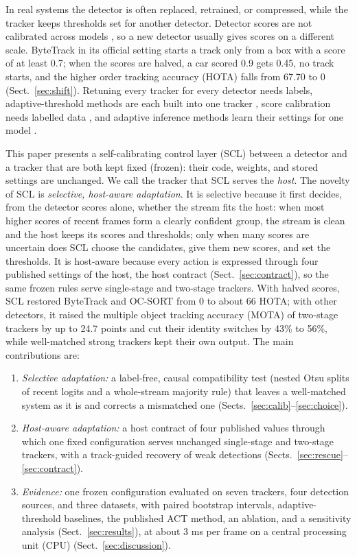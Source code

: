 \documentclass[pdflatex,sn-mathphys-num,iicol]{sn-jnl}
\newcommand{\scl}{SCL}
\begin{document}
In real systems the detector is often replaced, retrained, or compressed, while the tracker keeps
thresholds set for another detector. Detector scores are not calibrated across models
\cite{kuppers2020detcalib}, so a new detector usually gives scores on a different scale. ByteTrack in
its official setting starts a track only from a box with a score of at least 0.7; when the scores
are halved, a car scored 0.9 gets 0.45, no track starts, and the higher order tracking accuracy
(HOTA) \cite{luiten2021hota} falls from 67.70 to 0 (Sect.~\ref{sec:shift}). Retuning every tracker
for every detector needs labels, adaptive-threshold methods are each built into one tracker
\cite{ma2023adaptivebytetrack,shim2024adaptrack,act2026adaptive}, score calibration needs labelled
data \cite{kuppers2020detcalib}, and adaptive inference methods learn their settings for one model
\cite{han2022dynamic}.

This paper presents a self-calibrating control layer (\scl{}) between a detector and a tracker that
are both kept fixed (frozen): their code, weights, and stored settings are unchanged. We call the
tracker that \scl{} serves the \emph{host}. The novelty of \scl{} is \emph{selective, host-aware
adaptation}. It is selective because it first decides, from the detector scores alone, whether the
stream fits the host: when most higher scores of recent frames form a clearly confident group, the
stream is clean and the host keeps its scores and thresholds; only when many scores are uncertain
does \scl{} choose the candidates, give them new scores, and set the thresholds. It is host-aware
because every action is expressed through four published settings of the host, the host contract
(Sect.~\ref{sec:contract}), so the same frozen rules serve single-stage and two-stage trackers.
With halved scores, \scl{} restored ByteTrack and OC-SORT from 0 to about 66 HOTA; with other
detectors, it raised the multiple object tracking accuracy (MOTA) of two-stage trackers by up to
24.7 points and cut their identity switches by 43\% to 56\%, while well-matched strong trackers
kept their own output. The main contributions are:
\begin{enumerate}
\item \emph{Selective adaptation:} a label-free, causal compatibility test (nested Otsu splits of
      recent logits and a whole-stream majority rule) that leaves a well-matched system as it is
      and corrects a mismatched one (Sects.~\ref{sec:calib}--\ref{sec:choice}).
\item \emph{Host-aware adaptation:} a host contract of four published values through which one
      fixed configuration serves unchanged single-stage and two-stage trackers, with a track-guided
      recovery of weak detections (Sects.~\ref{sec:rescue}--\ref{sec:contract}).
\item \emph{Evidence:} one frozen configuration evaluated on seven trackers, four detection sources,
      and three datasets, with paired bootstrap intervals, adaptive-threshold baselines, the
      published ACT method, an ablation, and a sensitivity analysis (Sect.~\ref{sec:results}), at
      about 3 ms per frame on a central processing unit (CPU) (Sect.~\ref{sec:discussion}).
\end{enumerate}
\end{document}
